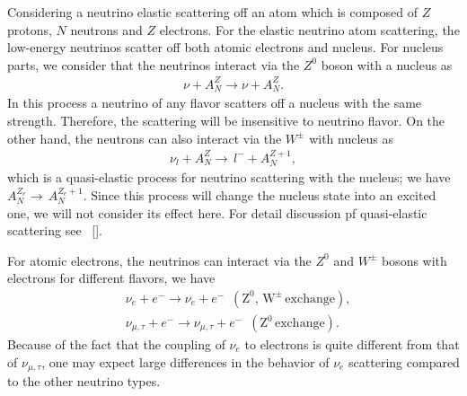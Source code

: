 Considering a neutrino elastic scattering off an atom which is composed of $Z$ protons, $N$ neutrons and $Z$ electrons. For the elastic neutrino atom scattering, the low-energy neutrinos scatter off both atomic electrons and nucleus. For nucleus parts, we consider that the neutrinos interact via the $Z^0$ boson with a nucleus as
\begin{align}
\nu+A^{Z}_N\longrightarrow\nu+A^{Z}_N.
\end{align}
In this process a neutrino of any flavor scatters off a nucleus with the same strength. Therefore, the scattering will be insensitive to neutrino flavor. On the other hand, the neutrons can also interact via the $W^\pm$ with nucleus as 
\begin{align}
\nu_l+A^{Z}_N\longrightarrow\,l^-+A^{{Z}+1}_N,
\end{align}
which is a quasi-elastic process for neutrino scattering with the nucleus; we have $A^{Z_e}_N\rightarrow\,A^{{Z_e}+1}_N$. Since this process will change the nucleus state into an excited one, we will not consider its effect here. For detail discussion pf quasi-elastic scattering see ~[\cite{SajjadAthar:2022pjt}].

For atomic electrons, the neutrinos can interact via the $Z^0$ and $W^\pm$ bosons with electrons for different flavors, we have
\begin{align}
&\nu_e+e^-\longrightarrow\nu_e+e^-\,\,\,(\mathrm{Z^0,\,W^\pm\,exchange}),\\
&\nu_{\mu,\tau}+e^-\longrightarrow\nu_{\mu,\tau}+e^-\,\,\,(\mathrm{Z^0\,exchange}).
\end{align}
Because of the fact that the coupling of $\nu_e$ to electrons is quite different from that of $\nu_{\mu,\tau}$, one may expect large differences in the behavior of $\nu_e$ scattering compared to the other neutrino types.


